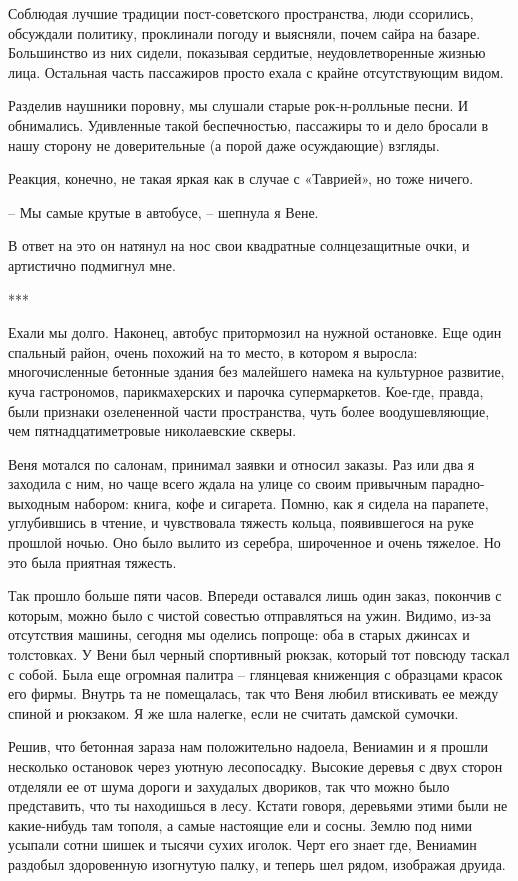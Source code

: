 \documentclass[
]{book}
\begin{document}
Соблюдая лучшие традиции пост-советского пространства, люди ссорились, обсуждали политику, проклинали погоду и выясняли, почем сайра на базаре. Большинство из них сидели, показывая сердитые, неудовлетворенные жизнью лица. Остальная часть пассажиров просто ехала с крайне отсутствующим видом.

Разделив наушники поровну, мы слушали старые рок-н-ролльные песни. И обнимались. Удивленные такой беспечностью, пассажиры то и дело бросали в нашу сторону не доверительные (а порой даже осуждающие) взгляды.

Реакция, конечно, не такая яркая как в случае с «Таврией», но тоже ничего.

-- Мы самые крутые в автобусе, -- шепнула я Вене.

В ответ на это он натянул на нос свои квадратные солнцезащитные очки, и артистично подмигнул мне.

***

Ехали мы долго. Наконец, автобус притормозил на нужной остановке. Еще один спальный район, очень похожий на то место, в котором я выросла: многочисленные бетонные здания без малейшего намека на культурное развитие, куча гастрономов, парикмахерских и парочка супермаркетов. Кое-где, правда, были признаки озелененной части пространства, чуть более воодушевляющие, чем пятнадцатиметровые николаевские скверы.

Веня мотался по салонам, принимал заявки и относил заказы. Раз или два я заходила с ним, но чаще всего ждала на улице со своим привычным парадно-выходным набором: книга, кофе и сигарета. Помню, как я сидела на парапете, углубившись в чтение, и чувствовала тяжесть кольца, появившегося на руке прошлой ночью. Оно было вылито из серебра, широченное и очень тяжелое. Но это была приятная тяжесть.

Так прошло больше пяти часов. Впереди оставался лишь один заказ, покончив с которым, можно было с чистой совестью отправляться на ужин. Видимо, из-за отсутствия машины, сегодня мы оделись попроще: оба в старых джинсах и толстовках. У Вени был черный спортивный рюкзак, который тот повсюду таскал с собой. Была еще огромная палитра -- глянцевая книженция с образцами красок его фирмы. Внутрь та не помещалась, так что Веня любил втискивать ее между спиной и рюкзаком. Я же шла налегке, если не считать дамской сумочки.

Решив, что бетонная зараза нам положительно надоела, Вениамин и я прошли несколько остановок через уютную лесопосадку. Высокие деревья с двух сторон отделяли ее от шума дороги и захудалых двориков, так что можно было представить, что ты находишься в лесу. Кстати говоря, деревьями этими были не какие-нибудь там тополя, а самые настоящие ели и сосны. Землю под ними усыпали сотни шишек и тысячи сухих иголок. Черт его знает где, Вениамин раздобыл здоровенную изогнутую палку, и теперь шел рядом, изображая друида.
\end{document}
